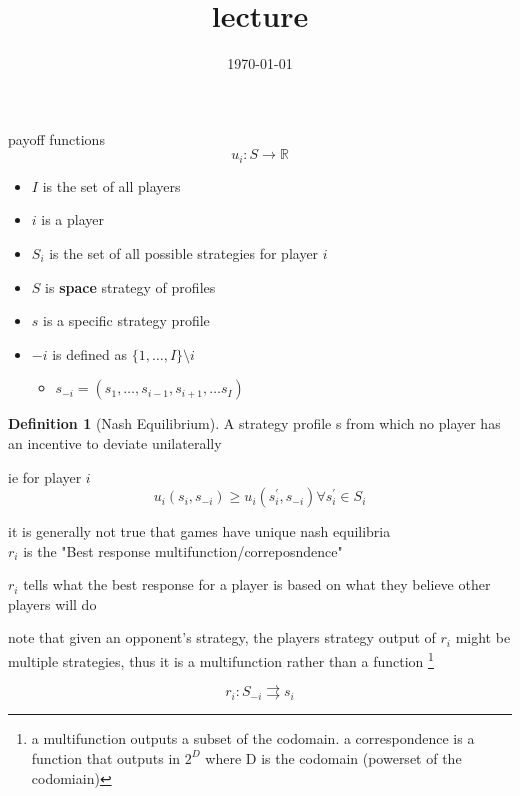 \documentclass{article}
\title{lecture}
\date{\today}
\theoremstyle{definition}
\newtheorem{definition}{Definition}
\begin{document}
\maketitle




payoff functions 
\begin{equation}
    u_i: S \rightarrow \mathbb{ R}
\end{equation}
\begin{itemize}
    \item \(I\) is the set of all players
    \item \(i\) is a player
    \item \(S_i\) is the set of all possible strategies for player \(i\)
    \item \(S\) is \textbf{space} strategy of profiles
    \item \(s\) is a specific strategy profile
    \item \(-i\) is defined as \(\{1,\dots,I\}\setminus i\)
    \begin{itemize}
        \item \(s_{-i} = (s_1,\dots , s_{i-1}, s_{i+1},\dots s_I)\)
    \end{itemize}
\end{itemize}

\begin{definition}[Nash Equilibrium]
    A strategy profile s from which no player has an incentive to deviate unilaterally
\end{definition}
ie for player \(i\)
\begin{equation}
    u_i(s_i,s_{-i})\geq u_i (s^\prime_i, s_{-i}) \forall s^\prime_i \in S_i
\end{equation}

it is generally not true that games have unique nash equilibria\\


\(r_i\) is the "Best response multifunction/correposndence"

\(r_i\) tells what the best response for a player is based on what they believe other players will do

note that given an opponent's strategy, the players strategy output of \(r_i\) might be multiple strategies, thus it is a multifunction rather than a function \footnote{a multifunction outputs a subset of the codomain. a correspondence is a function that outputs in \(2^D\) where D is the codomain (powerset of the codomiain)}

\begin{equation}
    r_i: S_{-i} \rightrightarrows s_i
\end{equation}
\end{document}

